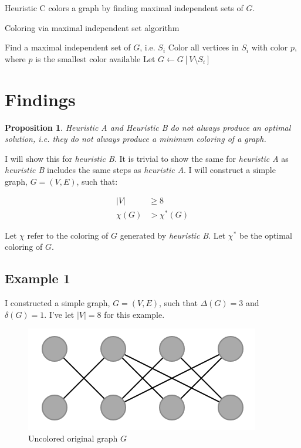 \documentclass{article}
\newtheorem{prop}{Proposition}
\begin{document}
Heuristic C colors a graph by finding maximal independent sets of \(G\).

\begin{algorithm}
\caption{Coloring via maximal independent set algorithm}
\begin{algorithmic}[1]
\State Find a maximal independent set of $G$, i.e. $S_i$
\State Color all vertices in $S_i$ with color $p$, where $p$ is the smallest color available
\State Let $G \leftarrow G[V \setminus S_i ] $
\EndWhile
\end{algorithmic}
\end{algorithm}

\newpage

\section*{Findings}

\begin{prop}
Heuristic A and Heuristic B do not always produce an optimal solution, i.e. they do not always produce a minimum coloring of a graph.
\end{prop}

I will show this for \emph{heuristic B}. It is trivial to show the same for \emph{heuristic A} as \emph{heuristic B} includes the same steps as \emph{heuristic A}. I will construct a simple graph, \(G = (V, E)\), such that:

\begin{align}
|V| &\geq 8 \\
\chi(G) &> \chi^{*}(G)
\end{align}

Let \(\chi\) refer to the coloring of \(G\) generated by \emph{heuristic B}. Let \(\chi^{*}\) be the optimal coloring of \(G\).

\subsection*{Example 1}
I constructed a simple graph, \(G = (V, E)\), such that \(\Delta(G) = 3\) and \(\delta(G) = 1\). I've let \(|V| = 8\) for this example.

\begin{figure}[H]
\centering
\includegraphics[scale=0.6]{images/graph-1.png}
\caption{Uncolored original graph \(G\)}
\end{figure}
\end{document}
